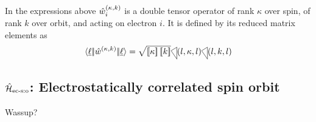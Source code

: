 \documentclass{article}
\begin{document}
In the expressions above $\hat{w}_{i}^{({\kappa},{k})}$ is a double tensor operator of rank $\kappa$ over spin, of rank $k$ over orbit, and acting on electron $i$. It is defined by its reduced matrix elements as
\begin{equation}
\redbraopket{\lorb}
    {\wdouble{}{\kappa}{k}}
    {\lorb}
    = \sqrt{\tpobraket{\kappa}
        \tpobraket{k}
    } \tricondition{l,\kappa,l}\tricondition{l,k,l}
\end{equation} 



\subsection{$\hat{\mathcal{H}}_\text{ec-s:o}$: Electrostatically correlated spin orbit}

Wassup? \cite{cowan_theory_1981}


% 


% 


% 


% 



% 

\printbibliography
\end{document}
